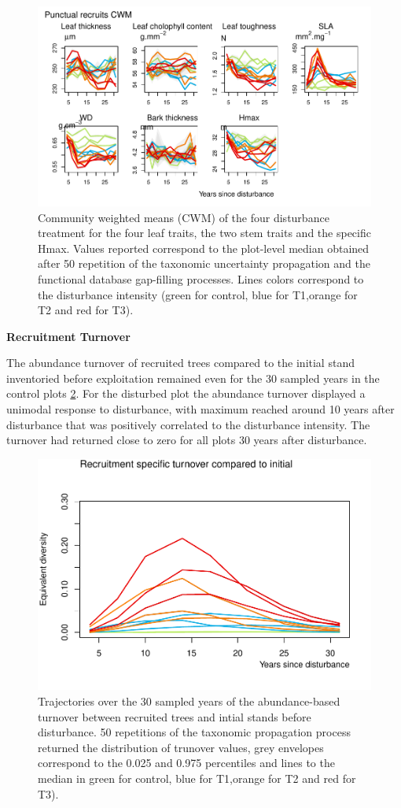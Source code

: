 \documentclass[fleqn,10pt]{ArtEcoFoG} %
\begin{document}
\begin{figure}

{\centering \includegraphics[width=0.8\linewidth]{RecruitmentTrajectories_files/figure-latex/Fig5-1} 

}

\caption{Community weighted means (CWM) of the four disturbance treatment for the four leaf traits, the two stem traits  and the specific Hmax. Values reported correspond to the plot-level median obtained after 50 repetition of the taxonomic uncertainty propagation and the functional database gap-filling processes. Lines colors correspond to the disturbance intensity (green for control, blue for T1,orange for T2 and red for T3).}\label{fig:Fig5}
\end{figure}

\textbf{Recruitment Turnover}

The abundance turnover of recruited trees compared to the initial stand
inventoried before exploitation remained even for the 30 sampled years
in the control plots \ref{fig:Fig6}. For the disturbed plot the
abundance turnover displayed a unimodal response to disturbance, with
maximum reached around 10 years after disturbance that was positively
correlated to the disturbance intensity. The turnover had returned close
to zero for all plots 30 years after disturbance.

\begin{figure}

{\centering \includegraphics[width=0.5\linewidth]{RecruitmentTrajectories_files/figure-latex/Fig6-1} 

}

\caption{Trajectories over the 30 sampled years of the abundance-based turnover between recruited trees and intial stands before disturbance. 50 repetitions of the taxonomic propagation process returned the distribution of trunover values, grey envelopes correspond to the 0.025 and 0.975 percentiles and lines to the median in green for control, blue for T1,orange for T2 and red for T3).}\label{fig:Fig6}
\end{figure}
\end{document}
